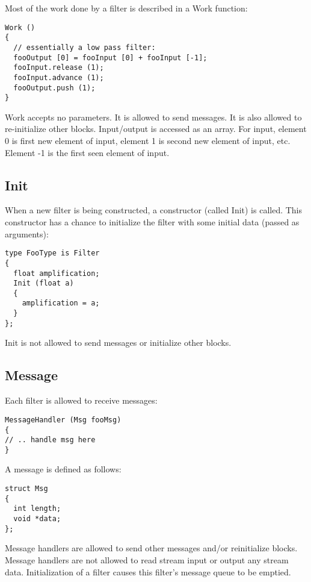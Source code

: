 \documentclass[twocolumn, draft]{article}
\begin{document}
Most of the work done by a filter is described in a Work function:

\begin{verbatim}
Work ()
{
  // essentially a low pass filter:
  fooOutput [0] = fooInput [0] + fooInput [-1];
  fooInput.release (1);
  fooInput.advance (1);
  fooOutput.push (1);
}
\end{verbatim}

Work accepts no parameters.  It is allowed to send messages.  It is also
allowed to re-initialize other blocks.
Input/output
is accessed as an array.  For input, element 0 is first new element of input,
element 1 is second new element of input, etc.  Element -1 is the first seen
element of input.

\subsection{Init}

When a new filter is being constructed, a constructor (called Init) is called.
This constructor has a chance to initialize the filter with some initial
data (passed as arguments):

\begin{verbatim}
type FooType is Filter
{
  float amplification;
  Init (float a)
  {
    amplification = a;
  }
};
\end{verbatim}

Init is not allowed to send messages or initialize other blocks.

\subsection{Message}

Each filter is allowed to receive messages:

\begin{verbatim}
MessageHandler (Msg fooMsg)
{
// .. handle msg here
}
\end{verbatim}

A message is defined as follows:

\begin{verbatim}
struct Msg
{
  int length;
  void *data;
};
\end{verbatim}

Message handlers are allowed to send other messages and/or reinitialize blocks.
Message handlers are not allowed to read stream input or output any stream data.
Initialization of a filter causes this filter's message queue to be emptied.
\end{document}
